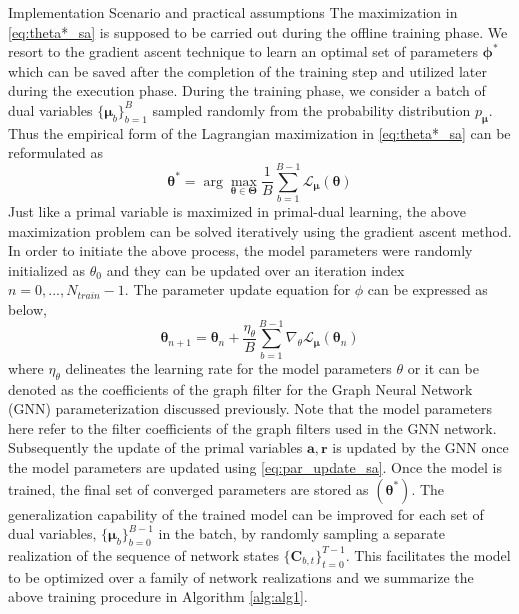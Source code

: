 \documentclass[lettersize,journal]{IEEEtran}
\begin{document}
\begin{subsection}{Implementation Scenario and practical assumptions}
The maximization in \eqref{eq:theta*_sa} is supposed to be carried out during the offline training phase. We resort to the gradient ascent technique to learn an optimal set of parameters $\bm{\phi}^*$ which can be saved after the completion of the training step and utilized later during the execution phase. During the training phase, we consider a batch of dual variables $\{ \bm{\mu}_b \}_{b=1}^{B}$ sampled randomly from the probability distribution $p_{\bm{\mu}}$. Thus the empirical form of the Lagrangian maximization in \eqref{eq:theta*_sa} can be reformulated as
\begin{equation} \label{eq:16}
    \bm{\theta}^* = \arg \max_{\bm{\theta} \in \bm{\Theta}} \frac{1}{B} \sum_{b=1}^{B-1} \mathcal{L}_{\bm{\mu}} (\bm{\theta})
\end{equation}
Just like a primal variable is maximized in primal-dual learning, the above maximization problem can be solved iteratively using the gradient ascent method. In order to initiate the above process, the model parameters were randomly initialized as $\theta_0$ and they can be updated over an iteration index $n=0,...,N_{train}-1$. The parameter update equation for $\phi$ can be expressed as below,
\begin{equation} \label{eq:par_update_sa}
    \bm{\theta}_{n+1} = \bm{\theta}_{n} + \frac{\eta_\theta}{B} \sum_{b=1}^{B-1} \nabla_\theta \mathcal{L}_{\bm{\mu}} (\bm{\theta}_n)
\end{equation}
where $\eta_\theta$ delineates the learning rate for the model parameters $\theta$ or it can be denoted as the coefficients of the graph filter for the Graph Neural Network (GNN) parameterization discussed previously. Note that the model parameters here refer to the filter coefficients of the graph filters used in the GNN network. Subsequently the update of the primal variables $\bm{a,r}$ is updated by the GNN once the model parameters are updated using \eqref{eq:par_update_sa}. Once the model is trained, the final set of converged parameters are stored as $(\bm{\theta}^*)$. The generalization capability of the trained model can be improved for each set of dual variables, $\{\bm{\mu}_b\}_{b=0}^{B-1}$ in the batch, by randomly sampling a separate realization of the sequence of network states $\{\mathbf{C}_{b,t} \}_{t=0}^{T-1}$. This facilitates the model to be optimized over a family of network realizations and we summarize the above training procedure in  Algorithm \ref{alg:alg1}. 


\end{subsection}
\end{document}
